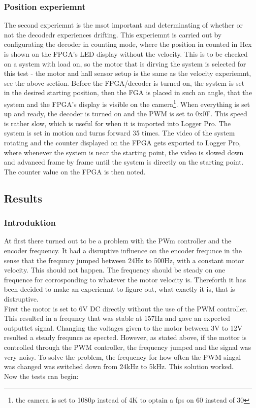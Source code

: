 \documentclass[../main]{subfiles}
\begin{document}
\subsubsection*{Position experiemnt}
The second experiemnt is the msot important and determinating of whether or not the decodedr experiences drifting. This experiemnt is carried out by configurating the decoder in counting mode, where the position in counted in Hex is shown on the FPGA's LED display without the velocity. This is to be checked on a system with load on, so the motor that is dirving the system is selected for this test - the motor and hall sensor setup is the same as the velocity experiemnt, see the above section. Before the FPGA/decoder is turned on, the system is set in the desired starting position, then the FGA is placed in such an angle, that the system and the FPGA's display is visible on the camera\footnote{the camera is set to 1080p instead of 4K to optain a fps on 60 instead of 30}. When everything is set up and ready, the decoder is turned on and the PWM is set to 0x0F. This speed is rather slow, which is useful for when it is imported into Logger Pro. The system is set in motion and turns forward 35 times. The video of the system rotating and the counter displayed on the FPGA gets exported to Logger Pro, where whenever the system is near the starting point, the video is slowed down and advanced frame by frame until the system is directly on the starting point. The counter value on the FPGA is then noted.
\subsection*{Results}

\subsubsection*{Introduktion}
At first there turned out to be a problem with the PWm controller and the encoder frequency. It had a disruptive influence on the encoder frequnce in the sense that the frequncy jumped between 24Hz to 500Hz, with a constant motor velocity. This should not happen. The frequency should be steady on one frequence for corrosponding to whatever the motor velocity is. Thereforth it has been decided to make an experiemnt to figure out, what exactly it is, that is distruptive. \\
First the motor is set to 6V DC directly without the use of the PWM controller. This resulted in a frequncy that was stable at 157Hz and gave an expected outputtet signal. Changing the voltages given to the motor between 3V to 12V resulted a steady frequnce as epected. However, as stated above, if the mottor is controlled through the PWM controller, the frequency jumped and the signal was very noisy. To solve the problem, the frequency for how often the PWM singal was changed was switched down from 24kHz to 5kHz. This solution worked.\\
Now the tests can begin:
\end{document}
